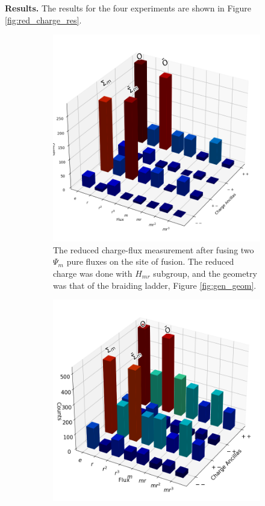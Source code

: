 \documentclass[two column]{article}
\begin{document}
\textbf{Results.}
The results for the four experiments are shown in Figure \ref{fig:red_charge_res}.
\begin{figure}
\centering
\begin{subfigure}{0.47\textwidth}
    \includegraphics[width = \linewidth]{Figures/fusion_glasses.png}
    \caption{The reduced charge-flux measurement after fusing two $\Psi_m$ pure fluxes on the site of fusion. The reduced charge was done with $H_{mr}$ subgroup, and the geometry was that of the braiding ladder, Figure \ref{fig:gen_geom}.}
    \label{fig:fusion_glass}
\end{subfigure}\hfill
\begin{subfigure}{0.47\textwidth}
    \includegraphics[width=\linewidth]{Figures/fusion_on_basketball.png}

\end{subfigure}
\end{figure}
\end{document}
